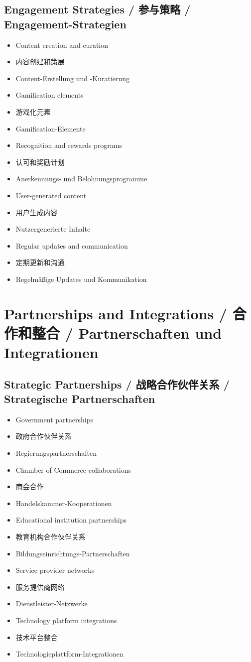 \subsection{Engagement Strategies / 参与策略 / Engagement-Strategien}
\begin{itemize}
    \item Content creation and curation
    \item 内容创建和策展
    \item Content-Erstellung und -Kuratierung
    \item Gamification elements
    \item 游戏化元素
    \item Gamification-Elemente
    \item Recognition and rewards programs
    \item 认可和奖励计划
    \item Anerkennungs- und Belohnungsprogramme
    \item User-generated content
    \item 用户生成内容
    \item Nutzergenerierte Inhalte
    \item Regular updates and communication
    \item 定期更新和沟通
    \item Regelmäßige Updates und Kommunikation
\end{itemize}

\section{Partnerships and Integrations / 合作和整合 / Partnerschaften und Integrationen}

\subsection{Strategic Partnerships / 战略合作伙伴关系 / Strategische Partnerschaften}
\begin{itemize}
    \item Government partnerships
    \item 政府合作伙伴关系
    \item Regierungspartnerschaften
    \item Chamber of Commerce collaborations
    \item 商会合作
    \item Handelskammer-Kooperationen
    \item Educational institution partnerships
    \item 教育机构合作伙伴关系
    \item Bildungseinrichtungs-Partnerschaften
    \item Service provider networks
    \item 服务提供商网络
    \item Dienstleister-Netzwerke
    \item Technology platform integrations
    \item 技术平台整合
    \item Technologieplattform-Integrationen
\end{itemize}

